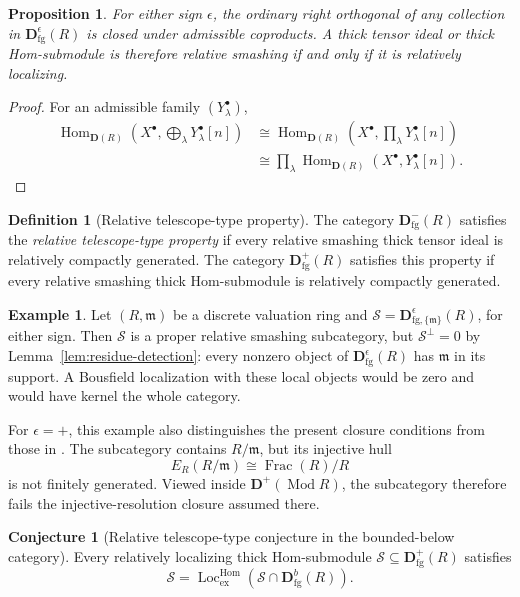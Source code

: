 \documentclass[11pt]{amsart}
\numberwithin{equation}{section}
\newtheorem{proposition}[theorem]{Proposition}
\theoremstyle{definition}
\newtheorem{definition}[theorem]{Definition}
\newtheorem{conjecture}[theorem]{Conjecture}
\newtheorem{example}[theorem]{Example}
\theoremstyle{remark}
\DeclareMathOperator{\Loc}{Loc}
\DeclareMathOperator{\Hom}{Hom}
\DeclareMathOperator{\Frac}{Frac}
\newcommand{\D}{\mathbf D}
\newcommand{\fg}{\mathrm{fg}}
\newcommand{\Lhom}{\Loc_{\mathrm{ex}}^{\Hom}}
\newcommand{\Mod}{\operatorname{Mod}}
\newcommand{\m}{\mathfrak m}
\begin{document}
\begin{proposition}\label{prop:orthogonal}
For either sign $\epsilon$, the ordinary right orthogonal of any collection in
$\D^\epsilon_{\fg}(R)$ is closed under admissible coproducts.
A thick tensor ideal or thick Hom-submodule is therefore relative
smashing if and only if it is relatively localizing.
\end{proposition}
\begin{proof}
For an admissible family $(Y^{\bullet}_\lambda)$,
\[
 \begin{aligned}
 \Hom_{\D(R)}\!\left(X^{\bullet},\bigoplus_\lambda Y^{\bullet}_\lambda[n]\right)
 &\cong\Hom_{\D(R)}\!\left(X^{\bullet},\prod_\lambda Y^{\bullet}_\lambda[n]\right)\\
 &\cong\prod_\lambda\Hom_{\D(R)}(X^{\bullet},Y^{\bullet}_\lambda[n]).
 \end{aligned}
\]
\end{proof}

\begin{definition}[Relative telescope-type property]\label{def:telescope-type}
The category $\D^-_{\fg}(R)$ satisfies the \emph{relative telescope-type
property} if every relative smashing thick tensor ideal is relatively
compactly generated. The category $\D^+_{\fg}(R)$ satisfies this property
if every relative smashing thick Hom-submodule is relatively compactly
generated.
\end{definition}

\begin{example}\label{ex:not-bousfield}
Let $(R,\m)$ be a discrete valuation ring and
$\mathcal S=\D^\epsilon_{\fg,\{\m\}}(R)$, for either sign.
Then $\mathcal S$ is a proper relative smashing subcategory, but
$\mathcal S^\perp=0$ by Lemma~\ref{lem:residue-detection}:
every nonzero object of $\D^\epsilon_{\fg}(R)$ has $\m$ in its support.
A Bousfield localization with these local objects would be zero and
would have kernel the whole category.

For $\epsilon=+$, this example also distinguishes the present closure
conditions from those in \cite[Theorem~6.7]{MT22}. The subcategory
contains $R/\m$, but its injective hull
\[
 E_R(R/\m)\cong\Frac(R)/R
\]
is not finitely generated. Viewed inside $\D^+(\Mod R)$, the
subcategory therefore fails the injective-resolution closure assumed
there.
\end{example}

\begin{conjecture}[Relative telescope-type conjecture in the bounded-below category]\label{conj:positive}
Every relatively localizing thick Hom-submodule
$\mathcal S\subseteq\D^+_{\fg}(R)$ satisfies
\[
 \mathcal S=\Lhom(\mathcal S\cap\D^b_{\fg}(R)).
\]
\end{conjecture}
\end{document}
